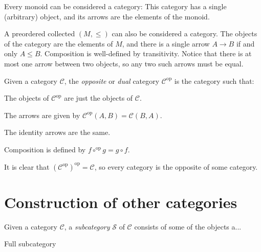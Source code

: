 \documentclass[article, a4paper, 11pt, oneside]{memoir}
\numberwithin{equation}{chapter}
\newcommand{\cat}[1]{\mathcal{#1}}
\newcommand{\catC}{\cat{C}}
\newcommand{\catS}{\cat{S}}
\newcommand{\op}{\mathrm{op}}
\theoremstyle{myexample}
\theoremstyle{myexamplebreak}
\begin{document}
\begin{examplebreak}
    \begin{enumexample}
        \item Every monoid can be considered a category: This category has a single (arbitrary) object, and its arrows are the elements of the monoid.
        
        \item A preordered collected $(M, \leq)$ can also be considered a category. The objects of the category are the elements of $M$, and there is a single arrow $A \to B$ if and only $A \leq B$. Composition is well-defined by transitivity. Notice that there is at most one arrow between two objects, so any two such arrows must be equal.
    \end{enumexample}
\end{examplebreak}


\begin{definition}
    Given a category $\catC$, the \emph{opposite} or \emph{dual} category $\catC^\op$ is the category such that:
    \begin{enumdef}
        \item The objects of $\catC^\op$ are just the objects of $\catC$.
        
        \item The arrows are given by $\catC^\op(A,B) = \catC(B,A)$.
        
        \item The identity arrows are the same.
        
        \item Composition is defined by $f \circ^\op g = g \circ f$.
    \end{enumdef}
\end{definition}
%
It is clear that $(\catC^\op)^\op = \catC$, so every category is the opposite of some category.



\chapter{Construction of other categories}

\begin{definition}[Subcategories]
    Given a category $\catC$, a \emph{subcategory} $\catS$ of $\catC$ consists of some of the objects a...

    Full subcategory
\end{definition}
\end{document}
